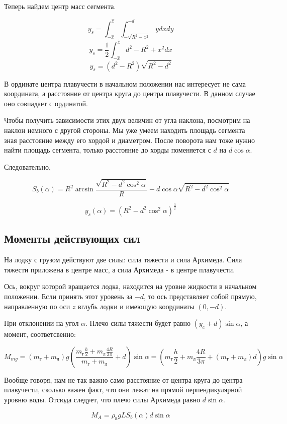 \documentclass[a4paper]{article}
\begin{document}
Теперь найдем центр масс сегмента.

$$ y_s = \int_{-\hat{x}}^{\hat{x}} \int_{-\sqrt{R^2-x^2}}^{-d} y dx dy $$
$$ y_s = \frac{1}{2} \int_{-\hat{x}}^{\hat{x}} d^2 - R^2 + x^2 dx $$
$$ y_s = (d^2 - R^2)\sqrt{R^2-d^2}  $$

В ординате центра плавучести в начальном положении нас интересует не сама координата, а расстояние от центра круга до центра плавучести. В данном случае оно совпадает с ординатой.

Чтобы получить зависимости этих двух величин от угла наклона, посмотрим на наклон немного с другой стороны. Мы уже умеем находить площадь сегмента зная расстояние между его хордой и диаметром. После поворота нам тоже нужно найти площадь сегмента, только расстояние до хорды поменяется с $d$ на $d\cos\alpha$. 

Следовательно, 

$$ S_b(\alpha) = R^2 \arcsin\frac{\sqrt{R^2-d^2\cos^2\alpha}}{R} - d\cos\alpha\sqrt{R^2-d^2\cos^2\alpha} $$

$$ y_s(\alpha) = (R^2-d^2\cos^2\alpha)^{\frac{3}{2}} $$


\subsection{Моменты действующих сил}

На лодку с грузом действуют две силы: сила тяжести и сила Архимеда. Сила тяжести приложена в центре масс, а сила Архимеда - в центре плавучести. 

Ось, вокруг которой вращается лодка, находится на уровне жидкости в начальном положении. Если принять этот уровень за $-d$, то ось представляет собой прямую, направленную по оси $z$ вглубь лодки и имеющую координаты $(0, -d)$.

При отклонении на угол $\alpha$. Плечо силы тяжести будет равно $(y_c+d)\sin\alpha$, а момент, соответсвенно:

$$ M_{mg} = (m_\text{г} + m_\text{л})g (\frac{m_\text{г}\frac{h}{2} + m_\text{л}\frac{4R}{3\pi}}{m_\text{г} + m_\text{л}} + d) \sin\alpha = (m_\text{г}\frac{h}{2} + m_\text{л}\frac{4R}{3\pi} + (m_\text{г} + m_\text{л})d)g\sin\alpha $$

Вообще говоря, нам не так важно само расстояние от центра круга до центра плавучести, сколько важен факт, что они лежат на прямой перпендикулярной уровню воды. Отсюда следует, что плечо силы Архимеда равно $d\sin\alpha$.

$$ M_A = \rho_\text{в}gLS_b(\alpha)d\sin\alpha $$
\end{document}
